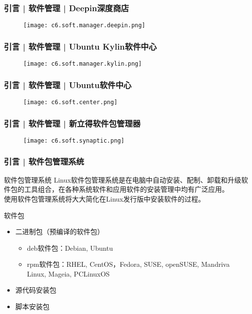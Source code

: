 \begin{frame}
  \frametitle{引言 | 软件管理 | Deepin深度商店}
  \begin{figure}
    \centering
    \texttt{[image: c6.soft.manager.deepin.png]}
  \end{figure}
\end{frame}

\begin{frame}
  \frametitle{引言 | 软件管理 | Ubuntu Kylin软件中心}
  \begin{figure}
    \centering
    \texttt{[image: c6.soft.manager.kylin.png]}
  \end{figure}
\end{frame}

\begin{frame}
  \frametitle{引言 | 软件管理 | Ubuntu软件中心}
  \begin{figure}
    \centering
    \texttt{[image: c6.soft.center.png]}
  \end{figure}
\end{frame}

\begin{frame}
  \frametitle{引言 | 软件管理 | 新立得软件包管理器}
  \begin{figure}
    \centering
    \texttt{[image: c6.soft.synaptic.png]}
  \end{figure}
\end{frame}

\begin{frame}
  \frametitle{引言 | 软件包管理系统}
  \begin{block}{软件包管理系统}
    Linux软件包管理系统是在电脑中自动安装、配制、卸载和升级软件包的工具组合，在各种系统软件和应用软件的安装管理中均有广泛应用。\\
    使用软件包管理系统将大大简化在Linux发行版中安装软件的过程。
  \end{block}
  \pause
  \begin{block}{\alert{软件包}}
    \begin{itemize}
      \item 二进制包（预编译的软件包）
	\begin{itemize}
	  \item deb软件包：Debian, Ubuntu
	  \item rpm软件包：RHEL, CentOS，Fedora, SUSE, openSUSE, Mandriva Linux, Mageia, PCLinuxOS
	\end{itemize}
      \item 源代码安装包
      \item 脚本安装包
    \end{itemize}
  \end{block}
\end{frame}

